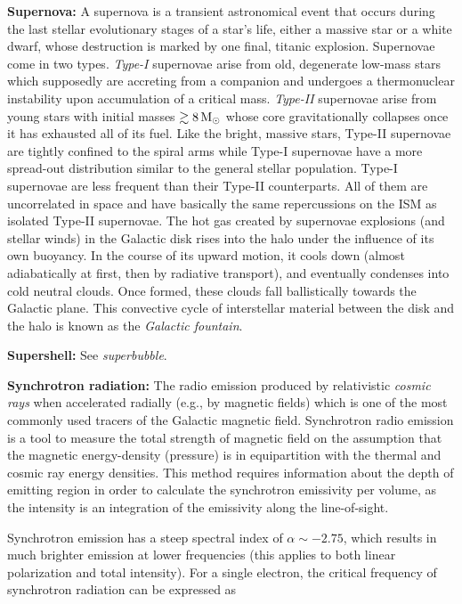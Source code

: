 \documentclass[a4paper,10pt]{article}
\begin{document}
{\noindent}\textbf{Supernova:} A supernova is a transient astronomical event that occurs during the last stellar evolutionary stages of a star's life, either a massive star or a white dwarf, whose destruction is marked by one final, titanic explosion. Supernovae come in two types. \textit{Type-I} supernovae arise from old, degenerate low-mass stars which supposedly are accreting from a companion and undergoes a thermonuclear instability upon accumulation of a critical mass. \textit{Type-II} supernovae arise from young stars with initial masses $\gtrsim8\,{\rm M}_\odot$ whose core gravitationally collapses once it has exhausted all of its fuel. Like the bright, massive stars, Type-II supernovae are tightly confined to the spiral arms while Type-I supernovae have a more spread-out distribution similar to the general stellar population. Type-I supernovae are less frequent than their Type-II counterparts. All of them are uncorrelated in space and have basically the same repercussions on the ISM as isolated Type-II supernovae. The hot gas created by supernovae explosions (and stellar winds) in the Galactic disk rises into the halo under the influence of its own buoyancy. In the course of its upward motion, it cools down (almost adiabatically at first, then by radiative transport), and eventually condenses into cold neutral clouds. Once formed, these clouds fall ballistically towards the Galactic plane. This convective cycle of interstellar material between the disk and the halo is known as the \textit{Galactic fountain}.

{\noindent}\textbf{Supershell:} See \textit{superbubble}.

{\noindent}\textbf{Synchrotron radiation:} The radio emission produced by relativistic \textit{cosmic rays} when accelerated radially (e.g., by magnetic fields) which is one of the most commonly used tracers of the Galactic magnetic field. Synchrotron radio emission is a tool to measure the total strength of magnetic field on the assumption that the magnetic energy-density (pressure) is in equipartition with the thermal and cosmic ray energy densities. This method requires information about the depth of emitting region in order to calculate the synchrotron emissivity per volume, as the intensity is an integration of the emissivity along the line-of-sight.

{\noindent}Synchrotron emission has a steep spectral index of $\alpha\sim-2.75$, which results in much brighter emission at lower frequencies (this applies to both linear polarization and total intensity). For a single electron, the critical frequency of synchrotron radiation can be expressed as
\end{document}

